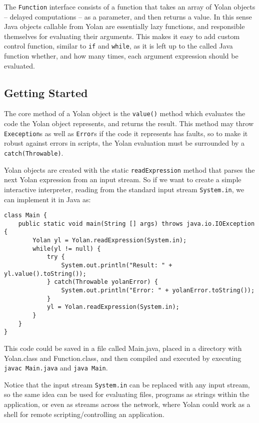 \documentclass[11pt]{report}
\begin{document}
The \verb|Function| interface consists of a function that takes an array of Yolan objects -- delayed computations -- as a parameter, and then returns a value. In this sense Java objects callable from Yolan are essentially lazy functions, and responsible themselves for evaluating their arguments. This makes it easy to add custom control function, similar to \verb|if| and \verb|while|, as it is left up to the called Java function whether, and how many times, each argument expression should be evaluated.

\subsection{Getting Started}
The core method of a Yolan object is the \verb|value()| method which evaluates the code the Yolan object represents, and returns the result. This method may throw \verb|Exeception|s as well as \verb|Error|s if the code it represents has faults, so to make it robust against errors in scripts, the Yolan evaluation must be surrounded by a \verb|catch(Throwable)|.

Yolan objects are created with the static \verb|readExpression| method that parses the next Yolan expression from an input stream. So if we want to create a simple interactive interpreter, reading from the standard input stream \verb|System.in|, we can implement it in Java as: \begin{lstlisting}
class Main {
    public static void main(String [] args) throws java.io.IOException {
        Yolan yl = Yolan.readExpression(System.in);
        while(yl != null) {
            try {
                System.out.println("Result: " + yl.value().toString());
            } catch(Throwable yolanError) {
                System.out.println("Error: " + yolanError.toString());
            }
            yl = Yolan.readExpression(System.in);
        }
    }
}\end{lstlisting} 

This code could be saved in a file called Main.java, placed in a directory with Yolan.class and Function.class, and then compiled and executed by executing \verb|javac Main.java| and \verb|java Main|.

Notice that the input stream \verb|System.in| can be replaced with any input stream, so the same idea can be used for evaluating files, programs as strings within the application, or even as streams across the network, where Yolan could work as a shell for remote scripting/controlling an application.
\end{document}
